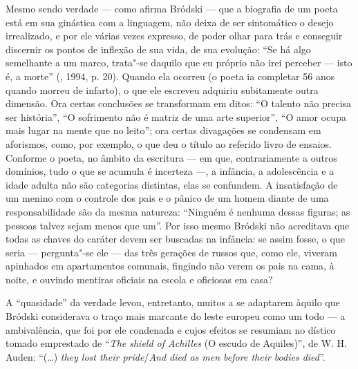 {Mesmo sendo verdade --- como afirma Bródski --- que a biografia de um poeta
está em sua ginástica com a linguagem, não deixa de ser sintomático o
desejo irrealizado, e por ele várias vezes expresso, de poder olhar para
trás e conseguir discernir os pontos de inflexão de sua vida, de sua
evolução: ``Se há algo semelhante a um marco, trata"-se daquilo que
eu próprio não irei perceber --- isto é, a morte'' (, 1994, p. 20). Quando ela
ocorreu (o poeta ia completar 56 anos quando morreu de infarto), o que
ele escreveu adquiriu subitamente outra dimensão. Ora certas conclusões
se transformam em ditos: ``O talento não precisa ser história'', ``O
sofrimento não é matriz de uma arte superior'', ``O amor ocupa mais
lugar na mente que no leito''; ora certas divagações se condensam em
aforismos, como, por exemplo, o que deu o título ao referido
livro de ensaios. Conforme o poeta, no âmbito da escritura --- em que,
contrariamente a outros domínios, tudo o que se acumula é incerteza ---, a
infância, a adolescência e a idade adulta não são categorias distintas,
elas se confundem. A insatisfação de um menino com o controle dos pais e
o pânico de um homem diante de uma responsabilidade são da mesma
natureza: ``Ninguém é nenhuma dessas figuras; as pessoas talvez sejam
menos que um''. Por isso mesmo Bródski não acreditava que todas as chaves do
caráter devem ser buscadas na infância: se assim fosse, o que seria ---
pergunta"-se ele --- das três gerações de russos que, como ele, viveram
apinhados em apartamentos comunais, fingindo não verem os pais na cama,
à noite, e ouvindo mentiras oficiais na escola e oficiosas em casa?

A ``quasidade'' da verdade levou, entretanto, muitos a se adaptarem
àquilo que Bródski considerava o traço mais marcante do leste europeu como
um todo --- a ambivalência, que foi por ele condenada e cujos efeitos se resumiam no
dístico tomado emprestado de ``\emph{The shield of Achilles} (O escudo de Aquiles)'', de W. H.
Auden: ``(\ldots{}) \emph{they lost their pride}/\emph{And died as men before their
bodies died}''.

}

